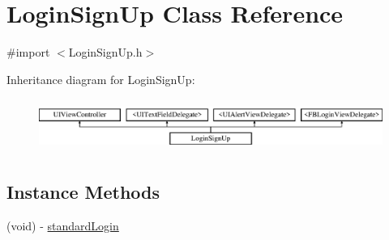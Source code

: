 \hypertarget{interface_login_sign_up}{\section{Login\+Sign\+Up Class Reference}
\label{interface_login_sign_up}
}


{\ttfamily \#import $<$Login\+Sign\+Up.\+h$>$}

Inheritance diagram for Login\+Sign\+Up\+:\begin{figure}[H]
\begin{center}
\leavevmode
\includegraphics[height=1.761006cm]{interface_login_sign_up}
\end{center}
\end{figure}
\subsection*{Instance Methods}
\begin{DoxyCompactItemize}
\item 
(void) -\/ \hyperlink{interface_login_sign_up_a648321618c03b2f173a983524db03493}{standard\+Login}
\end{DoxyCompactItemize}
